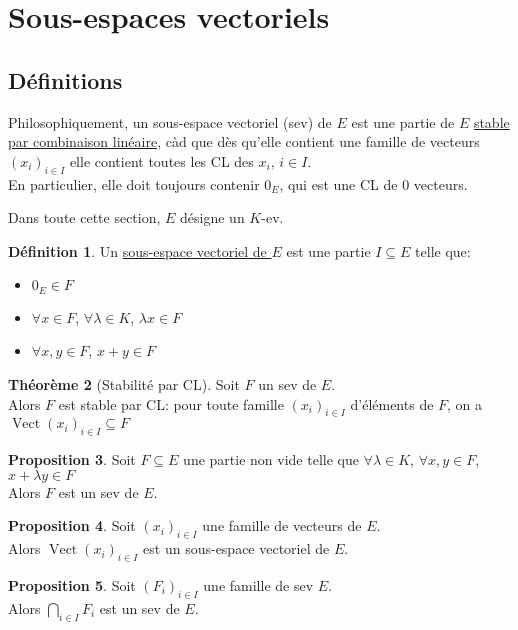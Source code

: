 \documentclass[10pt,a4paper]{article}
\theoremstyle{definition}
\newtheorem{proposition}{Proposition}[section]
\newtheorem{theorem}[proposition]{Théorème}
\newtheorem{definition}[proposition]{Définition}
\DeclareMathOperator{\vect}{Vect}
\begin{document}
\section{Sous-espaces vectoriels}
\subsection{Définitions}
Philosophiquement, un sous-espace vectoriel (sev) de $E$ est une partie de $E$ \uline{stable par combinaison linéaire}, càd que dès qu'elle contient une famille de vecteurs $(x_i)_{i \in I}$ elle contient toutes les CL des $x_i,\, i \in I$. \\
En particulier, elle doit toujours contenir $0_E$, qui est une CL de $0$ vecteurs.\medskip

Dans toute cette section, $E$ désigne un $K$-ev.
\begin{definition}
Un \uline{sous-espace vectoriel de $E$} est une partie $I \subseteq E$ telle que:
\begin{itemize}
\item $0_E \in F$
\item $\forall x \in F$, $\forall \lambda \in K$, $\lambda x \in F$
\item $\forall x, y \in F$, $x + y \in F$
\end{itemize}
\end{definition}
\begin{theorem}[Stabilité par CL]
Soit $F$ un sev de $E$. \\
Alors $F$ est stable par CL: pour toute famille $(x_i)_{i \in I}$ d'éléments de $F$, on a $\vect(x_i)_{i \in I} \subseteq F$
\end{theorem} 
\begin{proposition}
Soit $F \subseteq E$ une partie non vide telle que $\forall \lambda \in K$, $\forall x, y \in F$, $x + \lambda y \in F$ \\
Alors $F$ est un sev de $E$.
\end{proposition}
\begin{proposition}
Soit $(x_i)_{i \in I}$ une famille de vecteurs de $E$. \\
Alors $\vect(x_i)_{i \in I}$ est un sous-espace vectoriel de $E$.
\end{proposition}
\begin{proposition}
Soit $(F_i)_{i \in I}$ une famille de sev $E$. \\
Alors $\bigcap\limits_{i \in I} F_i$ est un sev de $E$.
\end{proposition}
\end{document}
